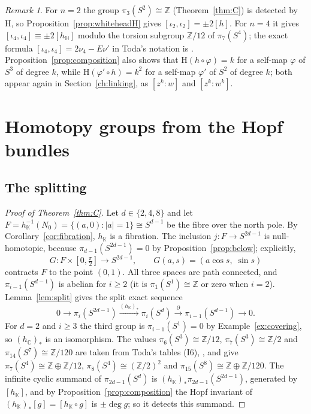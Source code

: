 \documentclass[11pt]{amsart}
\numberwithin{equation}{section}
\theoremstyle{plain}
\theoremstyle{definition}
\theoremstyle{remark}
\newtheorem{remark}[theorem]{Remark}
\newcommand{\C}{\mathbb{C}}
\newcommand{\Hq}{\mathbb{H}}
\newcommand{\K}{\mathbb{K}}
\newcommand{\Z}{\mathbb{Z}}
\newcommand{\Hopf}{\mathrm{H}}
\begin{document}
\begin{remark}\label{rem:whitehead-hopf}
For $n=2$ the group $\pi_3(S^2)\cong\Z$ (Theorem~\ref{thm:C}) is detected by $\Hopf$, so Proposition~\ref{prop:whiteheadH} gives $[\iota_2,\iota_2]=\pm2[h]$. For $n=4$ it gives $[\iota_4,\iota_4]\equiv\pm2[h_\Hq]$ modulo the torsion subgroup $\Z/12$ of $\pi_7(S^4)$; the exact formula $[\iota_4,\iota_4]=2\nu_4-E\nu'$ in Toda's notation is \cite[Chapter~V]{Tod62}. Proposition~\ref{prop:composition} also shows that $\Hopf(h\circ\varphi)=k$ for a self-map $\varphi$ of $S^3$ of degree $k$, while $\Hopf(\varphi'\circ h)=k^2$ for a self-map $\varphi'$ of $S^2$ of degree $k$; both appear again in Section~\ref{ch:linking}, as $[z^k:w]$ and $[z^k:w^k]$.
\end{remark}
\section{Homotopy groups from the Hopf bundles}\label{ch:groups}

\subsection{The splitting}

\begin{proof}[Proof of Theorem~\ref{thm:C}]
Let $d\in\{2,4,8\}$ and let $F=h_\K^{-1}(N_0)=\{(a,0):|a|=1\}\cong S^{d-1}$ be the fibre over the north pole. By Corollary~\ref{cor:fibration}, $h_\K$ is a fibration. The inclusion $j\colon F\to S^{2d-1}$ is null-homotopic, because $\pi_{d-1}(S^{2d-1})=0$ by Proposition~\ref{prop:below}; explicitly,
\begin{equation}\label{eq:nullhomotopy}
G\colon F\times[0,\tfrac\pi2]\to S^{2d-1},\qquad G(a,s)=(a\cos s,\;\sin s)
\end{equation}
contracts $F$ to the point $(0,1)$. All three spaces are path connected, and $\pi_{i-1}(S^{d-1})$ is abelian for $i\ge2$ (it is $\pi_1(S^1)\cong\Z$ or zero when $i=2$). Lemma~\ref{lem:split} gives the split exact sequence
\[
0\to\pi_i(S^{2d-1})\xrightarrow{(h_\K)_*}\pi_i(S^d)\xrightarrow{\ \partial\ }\pi_{i-1}(S^{d-1})\to0 .
\]
For $d=2$ and $i\ge3$ the third group is $\pi_{i-1}(S^1)=0$ by Example~\ref{ex:covering}, so $(h_\C)_*$ is an isomorphism. The values $\pi_6(S^3)\cong\Z/12$, $\pi_7(S^3)\cong\Z/2$ and $\pi_{14}(S^7)\cong\Z/120$ are taken from Toda's tables (I6), \cite[Chapter~XIV]{Tod62}, and give $\pi_7(S^4)\cong\Z\oplus\Z/12$, $\pi_8(S^4)\cong(\Z/2)^2$ and $\pi_{15}(S^8)\cong\Z\oplus\Z/120$. The infinite cyclic summand of $\pi_{2d-1}(S^d)$ is $(h_\K)_*\pi_{2d-1}(S^{2d-1})$, generated by $[h_\K]$, and by Proposition~\ref{prop:composition} the Hopf invariant of $(h_\K)_*[g]=[h_\K\circ g]$ is $\pm\deg g$; so it detects this summand.
\end{proof}
\end{document}
